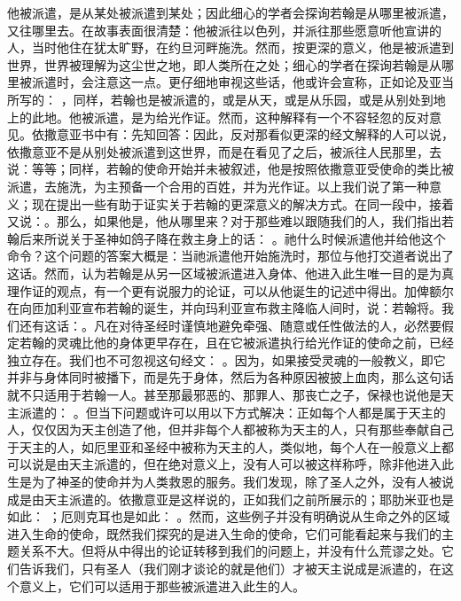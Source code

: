   他被派遣，是从某处被派遣到某处；因此细心的学者会探询若翰是从哪里被派遣，又往哪里去。在故事表面很清楚：他被派往以色列，并派往那些愿意听他宣讲的人，当时他住在犹太旷野，在约旦河畔施洗。然而，按更深的意义，他是被派遣到世界，世界被理解为这尘世之地，即人类所在之处；细心的学者在探询若翰是从哪里被派遣时，会注意这一点。更仔细地审视这些话，他或许会宣称，正如论及亚当所写的： ，同样，若翰也是被派遣的，或是从天，或是从乐园，或是从别处到地上的此地。他被派遣，是为给光作证。然而，这种解释有一个不容轻忽的反对意见。依撒意亚书中有：先知回答：因此，反对那看似更深的经文解释的人可以说，依撒意亚不是从别处被派遣到这世界，而是在看见了之后，被派往人民那里，去说：等等；同样，若翰的使命开始并未被叙述，他是按照依撒意亚受使命的类比被派遣，去施洗，为主预备一个合用的百姓，并为光作证。以上我们说了第一种意义；现在提出一些有助于证实关于若翰的更深意义的解决方式。在同一段中，接着又说：。那么，如果他是，他从哪里来？对于那些难以跟随我们的人，我们指出若翰后来所说关于圣神如鸽子降在救主身上的话： 。祂什么时候派遣他并给他这个命令？这个问题的答案大概是：当祂派遣他开始施洗时，那位与他打交道者说出了这话。然而，认为若翰是从另一区域被派遣进入身体、他进入此生唯一目的是为真理作证的观点，有一个更有说服力的论证，可以从他诞生的记述中得出。加俾额尔在向匝加利亚宣布若翰的诞生，并向玛利亚宣布救主降临人间时，说：若翰将。我们还有这话：。凡在对待圣经时谨慎地避免牵强、随意或任性做法的人，必然要假定若翰的灵魂比他的身体更早存在，且在它被派遣执行给光作证的使命之前，已经独立存在。我们也不可忽视这句经文： 。因为，如果接受灵魂的一般教义，即它并非与身体同时被播下，而是先于身体，然后为各种原因被披上血肉，那么这句话就不只适用于若翰一人。甚至那最邪恶的、那罪人、那丧亡之子，保禄也说他是天主派遣的： 。但当下问题或许可以用以下方式解决：正如每个人都是属于天主的人，仅仅因为天主创造了他，但并非每个人都被称为天主的人，只有那些奉献自己于天主的人，如厄里亚和圣经中被称为天主的人，类似地，每个人在一般意义上都可以说是由天主派遣的，但在绝对意义上，没有人可以被这样称呼，除非他进入此生是为了神圣的使命并为人类救恩的服务。我们发现，除了圣人之外，没有人被说成是由天主派遣的。依撒意亚是这样说的，正如我们之前所展示的；耶肋米亚也是如此： ；厄则克耳也是如此： 。然而，这些例子并没有明确说从生命之外的区域进入生命的使命，既然我们探究的是进入生命的使命，它们可能看起来与我们的主题关系不大。但将从中得出的论证转移到我们的问题上，并没有什么荒谬之处。它们告诉我们，只有圣人（我们刚才谈论的就是他们）才被天主说成是派遣的，在这个意义上，它们可以适用于那些被派遣进入此生的人。\par

